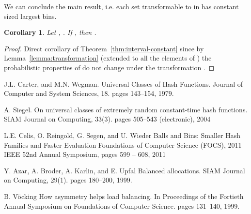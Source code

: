 \documentclass{article}
\newtheorem{corollary}{Corollary}
\begin{document}
We can conclude the main result, i.e. each set transformable to  in  has constant sized largest bins.
\begin{corollary}
Let , . 
If , then .
\end{corollary}
\begin{proof}
Direct corollary of Theorem~\ref{thm:interval-constant} since by Lemma~\ref{lemma:transformation} (extended to all the elements of ) the probabilistic properties of  do not change under the transformation .
\end{proof}


\begin{thebibliography}{32}
J.L. Carter, and M.N. Wegman. 
\newblock Universal Classes of Hash Functions.
\newblock Journal of Computer and System Sciences, 18. pages 143--154, 1979.

A. Siegel. 
\newblock On universal classes of extremely random constant-time hash functions.
\newblock SIAM Journal on Computing, 33(3). pages 505--543 (electronic), 2004

L.E. Celis, O. Reingold, G. Segen, and U. Wieder
\newblock Balls and Bins: Smaller Hash Families and Faster Evaluation
\newblock Foundations of Computer Science (FOCS), 2011 IEEE 52nd Annual Symposium, pages 599 -- 608, 2011

Y. Azar, A. Broder, A. Karlin, and E. Upfal
\newblock Balanced allocations.
\newblock SIAM Journal on Computing, 29(1). pages 180--200, 1999.

B. V\"{o}cking
\newblock How asymmetry helps load balancing.
\newblock In Proceedings of the Fortieth Annual Symposium on Foundations of Computer Science. pages 131--140, 1999.
\end{thebibliography}
\end{document}
